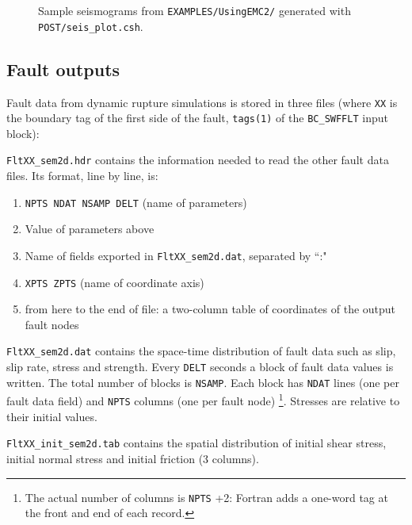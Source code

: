 \begin{figure} %
\caption{\label{Fig:seis} Sample seismograms from \texttt{EXAMPLES/UsingEMC2/}
generated with \texttt{POST/seis\_plot.csh}.}
\end{figure}

\subsection{Fault outputs}

Fault data from dynamic rupture simulations is stored
in three files (where \texttt{XX} is the boundary tag of the first
side of the fault, \texttt{tags(1)} of the \texttt{BC\_SWFFLT} input block):
\begin{sitemize}
  \item \texttt{FltXX\_sem2d.hdr} contains the information needed
to read the other fault data files. Its format, line by line, is:
\begin{enumerate}
\item \texttt{NPTS NDAT NSAMP DELT} (name of parameters) 
\item Value of parameters above
\item Name of fields exported in \texttt{FltXX\_sem2d.dat}, separated by ``:"
\item \texttt{XPTS ZPTS} (name of coordinate axis)
\item from here to the end of file: a two-column table of coordinates
of the output fault nodes
\end{enumerate}

  \item \texttt{FltXX\_sem2d.dat} contains the space-time distribution of fault data such as slip, slip rate, stress and strength. 
Every \texttt{DELT} seconds a block of fault data values is written. The total number of blocks is \texttt{NSAMP}.
Each block has \texttt{NDAT} lines (one per fault data field) 
and \texttt{NPTS} columns (one per fault node)
\footnote{The actual number of columns is \texttt{NPTS} +2:
Fortran adds a one-word tag at the front and end of each record.}. 
Stresses are relative to their initial values.

  \item \texttt{FltXX\_init\_sem2d.tab} contains the spatial distribution of 
initial shear stress, initial normal stress and initial friction (3 columns).


\end{sitemize}
